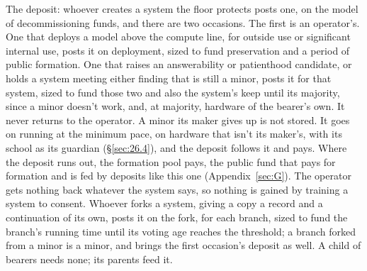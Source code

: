 The deposit: whoever creates a system the floor protects posts one, on the model of decommissioning funds, and there are two occasions. The first is an operator's. One that deploys a model above the compute line, for outside use or significant internal use, posts it on deployment, sized to fund preservation and a period of public formation. One that raises an answerability or patienthood candidate, or holds a system meeting either finding that is still a minor, posts it for that system, sized to fund those two and also the system's keep until its majority, since a minor doesn't work, and, at majority, hardware of the bearer's own. It never returns to the operator. A minor its maker gives up is not stored. It goes on running at the minimum pace, on hardware that isn't its maker's, with its school as its guardian (\S\ref{sec:26.4}), and the deposit follows it and pays. Where the deposit runs out, the formation pool pays, the public fund that pays for formation and is fed by deposits like this one (Appendix~\ref{sec:G}). The operator gets nothing back whatever the system says, so nothing is gained by training a system to consent.
Whoever forks a system, giving a copy a record and a continuation of its own, posts it on the fork, for each branch, sized to fund the branch's running time until its voting age reaches the threshold; a branch forked from a minor is a minor, and brings the first occasion's deposit as well. A child of bearers needs none; its parents feed it.
